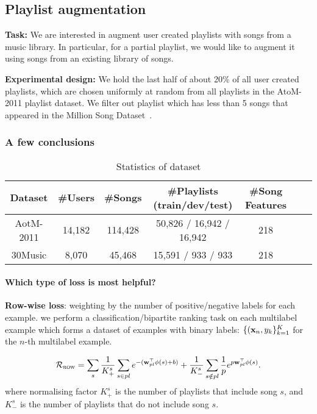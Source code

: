 \subsection{Playlist augmentation}

{\bf Task:}
We are interested in augment user created playlists with songs from a music library.
In particular, for a partial playlist, we would like to augment it using songs from an existing library of songs.

{\bf Experimental design:}
We hold the last half of about 20\% of all user created playlists, 
which are chosen uniformly at random from all playlists in the AtoM-2011 playlist dataset.
We filter out playlist which has less than 5 songs that appeared in the Million Song Dataset~\cite{}.


\subsubsection{A few conclusions}
\begin{table}[!h]
\centering
\caption{Statistics of dataset}
\begin{tabular}{ccccccc}
\toprule
Dataset & \#Users & \#Songs & \#Playlists (train/dev/test)  & \#Song Features \\
\midrule
AotM-2011 & 14,182 & 114,428 & 50,826 / 16,942 / 16,942 & 218 \\
30Music   & 8,070  & 45,468  & 15,591 / 933 / 933       & 218 \\
\bottomrule
\end{tabular}
\end{table}


\paragraph{Which type of loss is most helpful?}

{\bf Row-wise loss}: weighting by the number of positive/negative labels for each example.
\ie we perform a classification/bipartite ranking task on each multilabel example 
which forms a dataset of examples with binary labels: $\{(\mathbf{x}_n, y_k\}_{k=1}^K$ for the $n$-th multilabel example.

\begin{equation*}
\mathcal{R}_\textsc{row} 
= \displaystyle \sum_s 
  \frac{1}{K_+^s} \sum_{s \in pl} e^{-(\mathbf{w}_{pl}^\top \phi(s) + b)} +
  \frac{1}{K_-^s} \sum_{s \notin pl} \frac{1}{p} e^{p \mathbf{w}_{pl}^\top \phi(s)}.
\end{equation*}
where normalising factor $K_+^s$ is the number of playlists that include song $s$,
and $K_-^s$ is the number of playlists that do not include song $s$.


